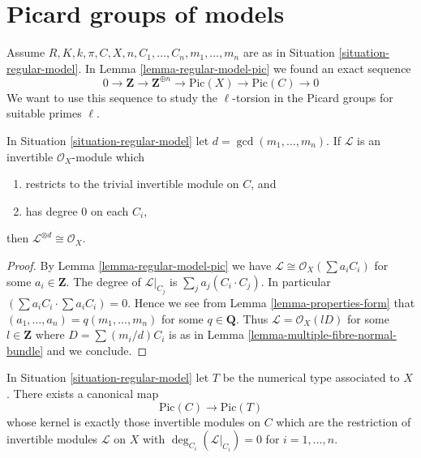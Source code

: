 \section{Picard groups of models}
\label{section-picard-groups-models}

\noindent
Assume $R, K, k, \pi, C, X, n, C_1, \ldots, C_n, m_1, \ldots, m_n$
are as in Situation \ref{situation-regular-model}.
In Lemma \ref{lemma-regular-model-pic} we found an exact sequence
$$
0 \to \mathbf{Z} \to \mathbf{Z}^{\oplus n} \to
\text{Pic}(X) \to \text{Pic}(C) \to 0
$$
We want to use this sequence to study the $\ell$-torsion in the
Picard groups for suitable primes $\ell$.

\begin{lemma}
\label{lemma-characterize-trivial}
In Situation \ref{situation-regular-model} let $d = \gcd(m_1, \ldots, m_n)$.
If $\mathcal{L}$ is an invertible $\mathcal{O}_X$-module which
\begin{enumerate}
\item restricts to the trivial invertible module on $C$, and
\item has degree $0$ on each $C_i$,
\end{enumerate}
then $\mathcal{L}^{\otimes d} \cong \mathcal{O}_X$.
\end{lemma}

\begin{proof}
By Lemma \ref{lemma-regular-model-pic} we have
$\mathcal{L} \cong \mathcal{O}_X(\sum a_i C_i)$ for some
$a_i \in \mathbf{Z}$. The degree of $\mathcal{L}|_{C_j}$
is $\sum_j a_j(C_i \cdot C_j)$. In particular
$(\sum a_i C_i \cdot \sum a_i C_i) = 0$.
Hence we see from Lemma \ref{lemma-properties-form}
that $(a_1, \ldots, a_n) = q(m_1, \ldots, m_n)$ for some
$q \in \mathbf{Q}$. Thus $\mathcal{L} = \mathcal{O}_X(lD)$
for some $l \in \mathbf{Z}$ where $D = \sum (m_i/d) C_i$ is as in
Lemma \ref{lemma-multiple-fibre-normal-bundle}
and we conclude.
\end{proof}

\begin{lemma}
\label{lemma-canonical-map-of-pic}
In Situation \ref{situation-regular-model}
let $T$ be the numerical type associated to $X$.
There exists a canonical map
$$
\text{Pic}(C) \to \text{Pic}(T)
$$
whose kernel is exactly those invertible modules on $C$
which are the restriction of invertible modules $\mathcal{L}$
on $X$ with $\deg_{C_i}(\mathcal{L}|_{C_i}) = 0$ for
$i = 1, \ldots, n$.
\end{lemma}

